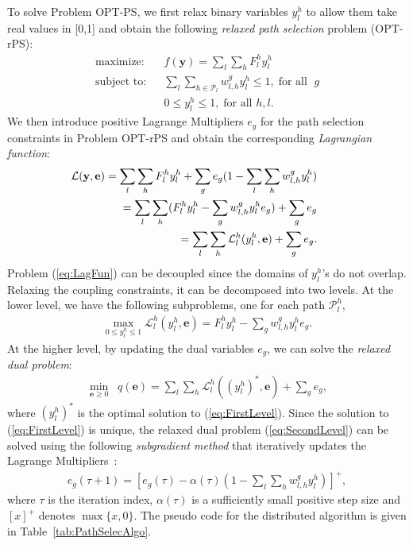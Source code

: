 \documentclass[12pt,onecolumn,draftclsnofoot]{IEEEtran} %
\begin{document}
To solve Problem OPT-PS, we first relax binary variables $y_l^h$ to allow them take real values in [0,1] and obtain the following {\em relaxed path selection} problem (OPT-rPS):
\begin{eqnarray}
	\mbox{maximize:} &&  f(\mathbf{y}) = \sum_l \sum_h F_l^h
	                      y_l^h \label{eq:rPathSelec} \\
	\mbox{subject to:} && \sum_l\sum_{h\in \mathcal{P}_l} 
	                      w_{l,h}^g y_l^h \le 1, \; \mbox{for all } \; g \nonumber \\
	                   && 0 \leq y_l^h \leq 1, \; \mbox{for all } h,l.   \nonumber
\end{eqnarray}
We then introduce positive Lagrange Multipliers $e_g$ for the path selection constraints in Problem OPT-rPS and obtain the corresponding {\em Lagrangian function}:
\begin{eqnarray} 
	&& \hspace{-0.45in} \mathcal{L}(\mathbf{y}, \mathbf{e}) = \sum_l\sum_h F_l^h y_l^h + \sum_g e_g (1 - \sum_l\sum_h w_{l,h}^g y_l^h) 
	\label{eq:LagFun} \\
	&& = \sum_l\sum_h ( F_l^hy_l^h - \sum_g w_{l,h}^g y_l^h e_g ) + \sum_g e_g \nonumber \\
	&& =	\sum_l\sum_h \mathcal{L}_l^h ( y_l^h, \mathbf{e} )+ \sum_g e_g.  \nonumber
\end{eqnarray}
Problem (\ref{eq:LagFun}) can be decoupled since the domains of $y_l^h$'s do not overlap.  Relaxing the coupling constraints, it can be decomposed into two levels.  At the lower level, we have the following subproblems, one for each path $\mathcal{P}_l^h$, 
\begin{eqnarray}\label{eq:FirstLevel}
   \max_{0 \leq y_l^h \leq 1} \mathcal{L}_l^h(y_l^h, \mathbf{e})=F_l^hy_l^h - \sum_g w_{l,h}^g y_l^h e_g.
\end{eqnarray}
At the higher level, by updating the dual variables $e_g$, we can solve the {\em relaxed dual problem}:
\begin{eqnarray}\label{eq:SecondLevel}
  \min_{\mathbf{e} \ge 0} \;\; q(\mathbf{e}) = \sum_l\sum_h \mathcal{L}_l^h \left( \left( y_l^h \right)^{\ast}, \mathbf{e} \right) + \sum_g e_g,
\end{eqnarray}
where $\left( y_l^h \right)^{\ast}$ is the optimal solution to (\ref{eq:FirstLevel}).  Since the solution to (\ref{eq:FirstLevel}) is unique, the relaxed dual problem (\ref{eq:SecondLevel}) can be solved using the following {\em subgradient method} that iteratively updates the Lagrange Multipliers~\cite{Bertsekas99}:
\begin{eqnarray}\label{eq:SubGrad}
  e_g(\tau+1) = \left[ e_g(\tau)-\alpha(\tau)(1 - \sum_l\sum_h w_{l,h}^g y_l^h) \right]^+,
\end{eqnarray}
where $\tau$ is the iteration index, $\alpha(\tau)$ is a sufficiently small positive step size and $[x]^+$ denotes $\max\{x, 0\}$.  The pseudo code for the distributed algorithm is given in Table~\ref{tab:PathSelecAlgo}. 
\end{document}
